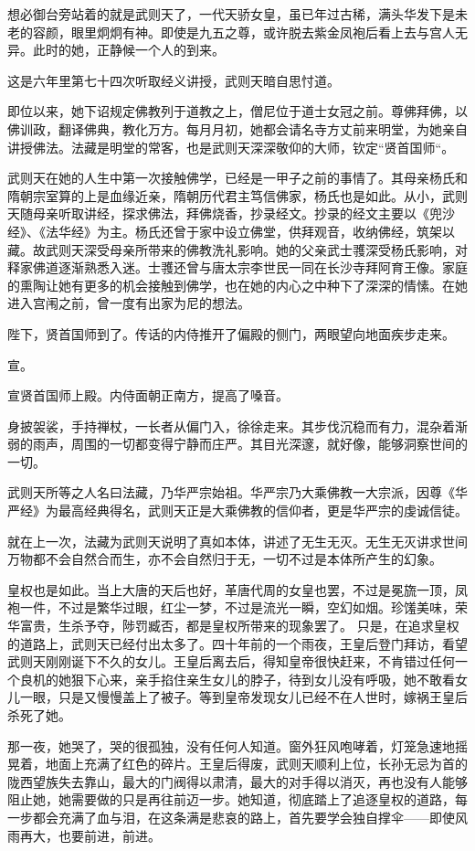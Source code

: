 \documentclass[UTF8,openany]{ctexbook}
\begin{document}
想必御台旁站着的就是武则天了，一代天骄女皇，虽已年过古稀，满头华发下是未老的容颜，眼里炯炯有神。即使是九五之尊，或许脱去紫金凤袍后看上去与宫人无异。此时的她，正静候一个人的到来。

这是六年里第七十四次听取经义讲授，武则天暗自思忖道。

即位以来，她下诏规定佛教列于道教之上，僧尼位于道士女冠之前。尊佛拜佛，以佛训政，翻译佛典，教化万方。每月月初，她都会请名寺方丈前来明堂，为她亲自讲授佛法。法藏是明堂的常客，也是武则天深深敬仰的大师，钦定“贤首国师“。

武则天在她的人生中第一次接触佛学，已经是一甲子之前的事情了。其母亲杨氏和隋朝宗室算的上是血缘近亲，隋朝历代君主笃信佛家，杨氏也是如此。从小，武则天随母亲听取讲经，探求佛法，拜佛烧香，抄录经文。抄录的经文主要以《兜沙经》、《法华经》为主。杨氏还曾于家中设立佛堂，供拜观音，收纳佛经，筑架以藏。故武则天深受母亲所带来的佛教洗礼影响。\cite{ref2}她的父亲武士彟深受杨氏影响，对释家佛道逐渐熟悉入迷。士彟还曾与唐太宗李世民一同在长沙寺拜阿育王像。家庭的熏陶让她有更多的机会接触到佛学，也在她的内心之中种下了深深的情愫。在她进入宫闱之前，曾一度有出家为尼的想法。

陛下，贤首国师到了。传话的内侍推开了偏殿的侧门，两眼望向地面疾步走来。

宣。

宣贤首国师上殿。内侍面朝正南方，提高了嗓音。

身披袈裟，手持禅杖，一长者从偏门入，徐徐走来。其步伐沉稳而有力，混杂着渐弱的雨声，周围的一切都变得宁静而庄严。其目光深邃，就好像，能够洞察世间的一切。

武则天所等之人名曰法藏，乃华严宗始祖。华严宗乃大乘佛教一大宗派，因尊《华严经》为最高经典得名，武则天正是大乘佛教的信仰者，更是华严宗的虔诚信徒。\cite{ref4}

就在上一次，法藏为武则天说明了真如本体，讲述了无生无灭。无生无灭讲求世间万物都不会自然合而生，亦不会自然归于无，一切不过是本体所产生的幻象。

皇权也是如此。当上大唐的天后也好，革唐代周的女皇也罢，不过是冕旒一顶，凤袍一件，不过是繁华过眼，红尘一梦，不过是流光一瞬，空幻如烟。珍馐美味，荣华富贵，生杀予夺，陟罚臧否，都是皇权所带来的现象罢了。
只是，在追求皇权的道路上，武则天已经付出太多了。四十年前的一个雨夜，王皇后登门拜访，看望武则天刚刚诞下不久的女儿。王皇后离去后，得知皇帝很快赶来，不肯错过任何一个良机的她狠下心来，亲手掐住亲生女儿的脖子，待到女儿没有呼吸，她不敢看女儿一眼，只是又慢慢盖上了被子。等到皇帝发现女儿已经不在人世时，嫁祸王皇后杀死了她。\cite{ref5}

那一夜，她哭了，哭的很孤独，没有任何人知道。窗外狂风咆哮着，灯笼急速地摇晃着，地面上充满了红色的碎片。王皇后得废，武则天顺利上位，长孙无忌为首的陇西望族失去靠山，最大的门阀得以肃清，最大的对手得以消灭，再也没有人能够阻止她，她需要做的只是再往前迈一步。她知道，彻底踏上了追逐皇权的道路，每一步都会充满了血与泪，在这条满是悲哀的路上，首先要学会独自撑伞——即使风雨再大，也要前进，前进。 
\end{document}
